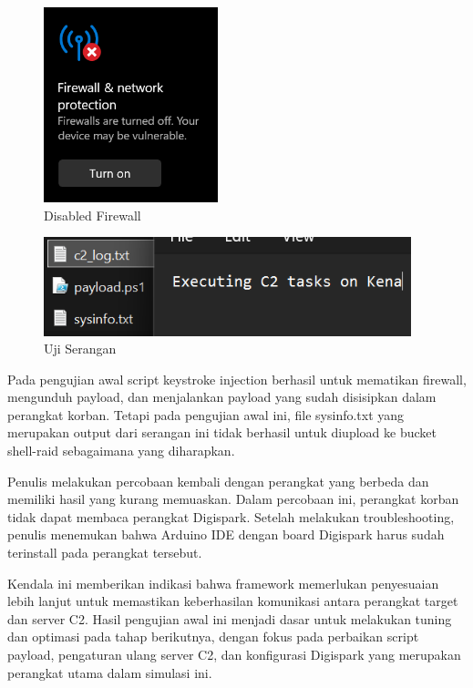 \begin{figure}
	\centering
	\includegraphics[width=0.45\textwidth]
		{assets/pics/firewall_bounty.png}
	\caption{Disabled Firewall}
	\label{fig:testGambar}
\end{figure}

\begin{figure}
	\centering
	\includegraphics[width=0.95\textwidth]
		{assets/pics/attack_result.png}
	\caption{Uji Serangan}
	\label{fig:testGambar}
\end{figure}

Pada pengujian awal script keystroke injection berhasil untuk mematikan firewall, mengunduh payload, dan menjalankan payload yang sudah disisipkan dalam perangkat korban. Tetapi pada pengujian awal ini, file sysinfo.txt yang merupakan output dari serangan ini tidak berhasil untuk diupload ke bucket shell-raid sebagaimana yang diharapkan.


Penulis melakukan percobaan kembali dengan perangkat yang berbeda dan memiliki hasil yang kurang memuaskan. Dalam percobaan ini, perangkat korban tidak dapat membaca perangkat Digispark. Setelah melakukan troubleshooting, penulis menemukan bahwa Arduino IDE dengan board Digispark harus sudah terinstall pada perangkat tersebut. 


Kendala ini memberikan indikasi bahwa framework memerlukan penyesuaian lebih lanjut untuk memastikan keberhasilan komunikasi antara perangkat target dan server C2. Hasil pengujian awal ini menjadi dasar untuk melakukan tuning dan optimasi pada tahap berikutnya, dengan fokus pada perbaikan script payload, pengaturan ulang server C2, dan konfigurasi Digispark yang merupakan perangkat utama dalam simulasi ini.

